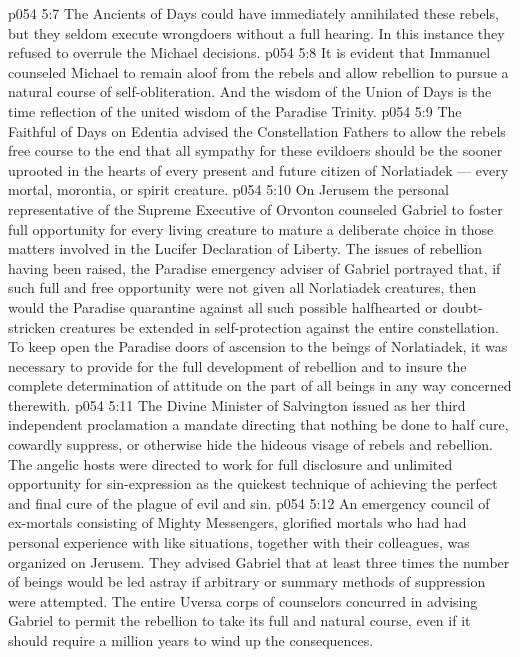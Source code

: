 \vs p054 5:7 \pc {}\bibnobreakspace The Ancients of Days could have immediately annihilated these rebels, but they seldom execute wrongdoers without a full hearing. In this instance they refused to overrule the Michael decisions.
\vs p054 5:8 \pc {}\bibnobreakspace It is evident that Immanuel counseled Michael to remain aloof from the rebels and allow rebellion to pursue a natural course of self\hyp{}obliteration. And the wisdom of the Union of Days is the time reflection of the united wisdom of the Paradise Trinity.
\vs p054 5:9 \pc {}\bibnobreakspace The Faithful of Days on Edentia advised the Constellation Fathers to allow the rebels free course to the end that all sympathy for these evildoers should be the sooner uprooted in the hearts of every present and future citizen of Norlatiadek --- every mortal, morontia, or spirit creature.
\vs p054 5:10 \pc {}\bibnobreakspace On Jerusem the personal representative of the Supreme Executive of Orvonton counseled Gabriel to foster full opportunity for every living creature to mature a deliberate choice in those matters involved in the Lucifer Declaration of Liberty. The issues of rebellion having been raised, the Paradise emergency adviser of Gabriel portrayed that, if such full and free opportunity were not given all Norlatiadek creatures, then would the Paradise quarantine against all such possible halfhearted or doubt\hyp{}stricken creatures be extended in self\hyp{}protection against the entire constellation. To keep open the Paradise doors of ascension to the beings of Norlatiadek, it was necessary to provide for the full development of rebellion and to insure the complete determination of attitude on the part of all beings in any way concerned therewith.
\vs p054 5:11 \pc {}\bibnobreakspace The Divine Minister of Salvington issued as her third independent proclamation a mandate directing that nothing be done to half cure, cowardly suppress, or otherwise hide the hideous visage of rebels and rebellion. The angelic hosts were directed to work for full disclosure and unlimited opportunity for sin\hyp{}expression as the quickest technique of achieving the perfect and final cure of the plague of evil and sin.
\vs p054 5:12 \pc {}\bibnobreakspace An emergency council of ex\hyp{}mortals consisting of Mighty Messengers, glorified mortals who had had personal experience with like situations, together with their colleagues, was organized on Jerusem. They advised Gabriel that at least three times the number of beings would be led astray if arbitrary or summary methods of suppression were attempted. The entire Uversa corps of counselors concurred in advising Gabriel to permit the rebellion to take its full and natural course, even if it should require a million years to wind up the consequences.
